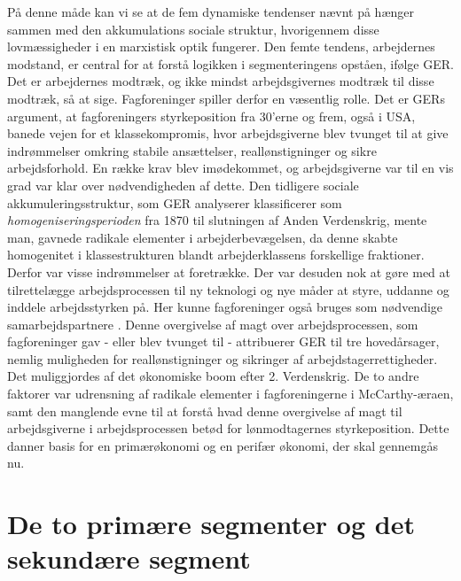 På denne måde kan vi se at de fem dynamiske tendenser nævnt på  hænger sammen med den akkumulations sociale struktur, hvorigennem disse lovmæssigheder i en marxistisk optik fungerer. Den femte tendens, arbejdernes modstand, er central for at forstå logikken i segmenteringens opståen, ifølge GER. Det er arbejdernes modtræk, og ikke mindst arbejdsgivernes modtræk til disse modtræk, så at sige. 
Fagforeninger spiller derfor en væsentlig rolle. Det er GERs argument, at fagforeningers styrkeposition fra 30'erne og frem, også i USA, banede vejen for et klassekompromis, hvor arbejdsgiverne blev tvunget til at give indrømmelser omkring stabile ansættelser, reallønstigninger og sikre arbejdsforhold. En række krav blev imødekommet, og arbejdsgiverne var til en vis grad var klar over nødvendigheden af dette. Den tidligere sociale akkumuleringsstruktur, som GER analyserer klassificerer som \emph{homogeniseringsperioden} fra 1870 til slutningen af Anden Verdenskrig, mente man, gavnede radikale elementer i arbejderbevægelsen, da denne skabte homogenitet i klassestrukturen blandt arbejderklassens forskellige fraktioner. Derfor var visse indrømmelser at foretrække. Der var desuden nok at gøre med at tilrettelægge arbejdsprocessen til ny teknologi og nye måder at styre, uddanne og inddele arbejdsstyrken på. Her kunne fagforeninger også bruges som nødvendige samarbejdspartnere \parencite[186f]{Gordon1982}. Denne overgivelse af magt over arbejdsprocessen, som fagforeninger gav - eller blev tvunget til - attribuerer GER til tre hovedårsager, nemlig muligheden for reallønstigninger og sikringer af arbejdstagerrettigheder. Det  muliggjordes af det økonomiske boom efter 2. Verdenskrig. De to andre faktorer var udrensning af radikale elementer i fagforeningerne i McCarthy-æraen, samt den manglende evne til at forstå hvad denne overgivelse af magt til arbejdsgiverne i arbejdsprocessen betød for lønmodtagernes styrkeposition. Dette danner basis for en primærøkonomi og en perifær økonomi, der skal gennemgås nu.

\section{De to primære segmenter og det sekundære segment \label{AST_primuafprimundersekundaer}}


